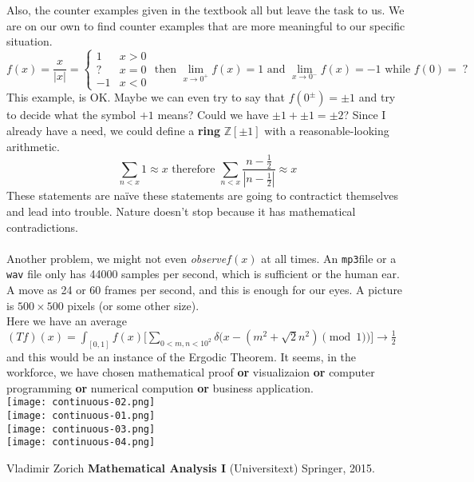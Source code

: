 \documentclass[12pt]{article}
\begin{document}
Also, the counter examples given in the textbook all but leave the task to us.  We are on our own to find counter examples that are more meaningful to our specific situation.
$$ f(x) = \frac{x}{|x|} = \left\{ 
\begin{array}{rc} 
1 & x > 0 \\
? & x = 0 \\
-1 & x < 0
\end{array}\right. \text{ then } \lim_{x \to 0^+} f(x) = 1 \text{ and }\lim_{x \to 0^-}f(x) = -1 \text{ while }f(0) = \; ?$$
This example, is OK.  Maybe we can even try to say that $f(0^\pm) = \pm 1$ and try to decide what the symbol $+1$ means?  Could we have $\pm 1 + \pm 1 = \pm 2$?  Since I already have a need, we could define a \textbf{ring} $\mathbb{Z}[\pm 1]$ with a reasonable-looking arithmetic.  
$$ \sum_{n < x} 1 \approx x \text{ therefore } \sum_{n < x} \frac{n-\frac{1}{2}}{|n - \frac{1}{2}|} \approx x $$
These statements are na\"{i}ve these statements are going to contractict themselves and lead into trouble.  Nature doesn't stop because it has mathematical contradictions.  \\ \\ 
Another problem, we might not even \textit{observe}$f(x)$ at all times.  An \texttt{mp3}file or a \texttt{wav} file only has 44000 samples per second, which is sufficient or the human ear.  A move as 24 or 60 frames per second, and this is enough for our eyes. A picture is $500 \times 500$ pixels (or some other size).\\
\newpage \noindent
Here we have an average $ (Tf)(x) = \int_{[0,1]} f(x) \Big[ \sum_{0 < m,n < 10^2} \delta\big(x - (m^2 + \sqrt{2}n^2)\pmod 1 \big)\Big] \to \frac{1}{2}$ and this would be an instance of the Ergodic Theorem.  It seems, in the workforce, we have chosen mathematical proof \textbf{or} visualizaion \textbf{or} computer programming \textbf{or} numerical compution \textbf{or} business application.  \\
\texttt{[image: continuous-02.png]}\\  
\texttt{[image: continuous-01.png]}\\
\texttt{[image: continuous-03.png]}\\  
\texttt{[image: continuous-04.png]}\\
\vfill
\begin{thebibliography}{} 
\item Vladimir Zorich \textbf{Mathematical Analysis I} (Universitext) Springer, 2015.
\end{thebibliography}
\end{document}
